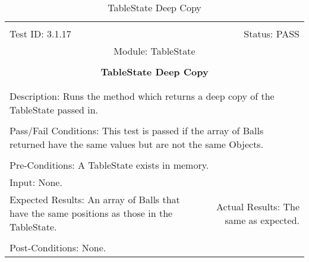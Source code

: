 \documentclass[titlepage]{article}
\begin{document}
\begin{center}
\begin{table}[h!]
\begin{tabular}{|l r|}\hline&\\[-2mm]
	Test ID: 3.1.17	&Status: PASS\\[-3mm]
	\multicolumn{2}{|c|}{Module: TableState}\\&\\
	\multicolumn{2}{|c|}{\textbf{\large{TableState Deep Copy}}}\\&\\\hline&\\[-3mm]
	\multicolumn{2}{|p{\textwidth}|}{Description: Runs the method which returns a deep copy of the TableState passed in.}\\[1mm]\hline&\\[-3mm]
	\multicolumn{2}{|p{\textwidth}|}{Pass/Fail Conditions: This test is passed if the array of Balls returned have the same values but are not the same Objects.}\\[1mm]\hline&\\[-3mm]
	\multicolumn{2}{|p{\textwidth}|}{Pre-Conditions: A TableState exists in memory.}\\[4mm]
	\multicolumn{2}{|p{\textwidth}|}{Input: None.}\\[2mm]\hline
	\multicolumn{1}{|p{0.49\textwidth}}{Expected Results: An array of Balls that have the same positions as those in the TableState.}	&\multicolumn{1}{|p{0.45\textwidth}|}{Actual Results: The same as expected.}\\\hline&\\[-3mm]
	\multicolumn{2}{|p{\textwidth}|}{Post-Conditions: None.}\\\hline
\end{tabular}
\caption{TableState Deep Copy}
\end{table}
\end{center}
\newpage
\end{document}

